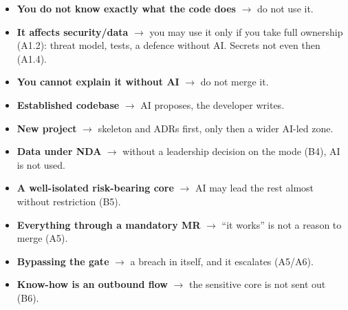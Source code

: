 \begin{itemize}
\item \textbf{You do not know exactly what the code does} $\rightarrow$ do not use it.
\item \textbf{It affects security/data} $\rightarrow$ you may use it only if you take full ownership (A1.2): threat model, tests, a defence without AI. Secrets not even then (A1.4).
\item \textbf{You cannot explain it without AI} $\rightarrow$ do not merge it.
\item \textbf{Established codebase} $\rightarrow$ AI proposes, the developer writes.
\item \textbf{New project} $\rightarrow$ skeleton and ADRs first, only then a wider AI-led zone.
\item \textbf{Data under NDA} $\rightarrow$ without a leadership decision on the mode (B4), AI is not used.
\item \textbf{A well-isolated risk-bearing core} $\rightarrow$ AI may lead the rest almost without restriction (B5).
\item \textbf{Everything through a mandatory MR} $\rightarrow$ \enquote{it works} is not a reason to merge (A5).
\item \textbf{Bypassing the gate} $\rightarrow$ a breach in itself, and it escalates (A5/A6).
\item \textbf{Know-how is an outbound flow} $\rightarrow$ the sensitive core is not sent out (B6).
\end{itemize}


